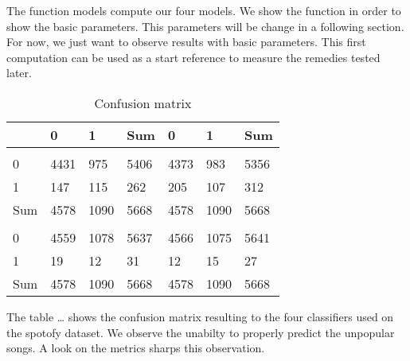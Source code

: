 \documentclass[
]{book}
\newenvironment{Shaded}{\begin{snugshade}}{\end{snugshade}}
\newcommand{\DecValTok}[1]{\textcolor[rgb]{0.00,0.00,0.81}{#1}}
\newcommand{\FunctionTok}[1]{\textcolor[rgb]{0.00,0.00,0.00}{#1}}
\newcommand{\NormalTok}[1]{#1}
\newcommand{\SpecialCharTok}[1]{\textcolor[rgb]{0.00,0.00,0.00}{#1}}
\newcommand{\StringTok}[1]{\textcolor[rgb]{0.31,0.60,0.02}{#1}}
\begin{document}
The function models compute our four models. We show the function in order to show the basic parameters. This parameters will be change in a following section. For now, we just want to observe results with basic parameters. This first computation can be used as a start reference to measure the remedies tested later.

\begin{table}

\caption{\label{tab:unnamed-chunk-4}Confusion matrix}
\centering
\begin{tabular}[t]{l|l|l|l|l|l|l}
\hline
  & 0 & 1 & Sum & 0 & 1 & Sum\\
\hline
\cellcolor{lightgrey}{} & \cellcolor{lightgrey}{rf} & \cellcolor{lightgrey}{} & \cellcolor{lightgrey}{} & \cellcolor{lightgrey}{bayes} & \cellcolor{lightgrey}{} & \cellcolor{lightgrey}{}\\
\hline
0 & 4431 & 975 & 5406 & 4373 & 983 & 5356\\
\hline
1 & 147 & 115 & 262 & 205 & 107 & 312\\
\hline
Sum & 4578 & 1090 & 5668 & 4578 & 1090 & \vphantom{1} 5668\\
\hline
\cellcolor{lightgrey}{} & \cellcolor{lightgrey}{lda} & \cellcolor{lightgrey}{} & \cellcolor{lightgrey}{} & \cellcolor{lightgrey}{svm} & \cellcolor{lightgrey}{} & \cellcolor{lightgrey}{}\\
\hline
0 & 4559 & 1078 & 5637 & 4566 & 1075 & 5641\\
\hline
1 & 19 & 12 & 31 & 12 & 15 & 27\\
\hline
Sum & 4578 & 1090 & 5668 & 4578 & 1090 & 5668\\
\hline
\end{tabular}
\end{table}

The table \ldots{} shows the confusion matrix resulting to the four classifiers used on the spotofy dataset. We observe the unabilty to properly predict the unpopular songs. A look on the metrics sharps this observation.

\begin{Shaded}
\end{Shaded}
\end{document}
